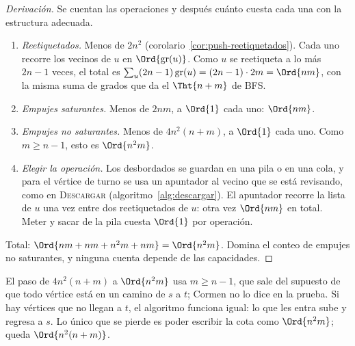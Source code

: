 \documentclass[11pt,letterpaper]{article}
\begin{document}
\begin{proof}[Derivación]
  Se cuentan las operaciones y después cuánto cuesta cada una con la
  estructura adecuada.
  \begin{enumerate}
    \item \emph{Reetiquetados.} Menos de $2n^2$
          (corolario~\ref{cor:push-reetiquetados}). Cada uno recorre los
          vecinos de $u$ en $\Ord{\text{gr}(u)}$. Como $u$ se reetiqueta
          a lo más $2n - 1$ veces, el total es
          $\sum_u (2n - 1)\,\text{gr}(u) = (2n - 1) \cdot 2m = \Ord{nm}$,
          con la misma suma de grados que da el $\Tht{n + m}$ de BFS.
    \item \emph{Empujes saturantes.} Menos de $2nm$, a $\Ord{1}$ cada
          uno: $\Ord{nm}$.
    \item \emph{Empujes no saturantes.} Menos de $4n^2(n + m)$, a
          $\Ord{1}$ cada uno. Como $m \ge n - 1$, esto es
          $\Ord{n^2 m}$.
    \item \emph{Elegir la operación.} Los desbordados se guardan en una
          pila o en una cola, y para el vértice de turno se usa un
          apuntador al vecino que se está revisando, como en
          \textsc{Descargar} (algoritmo~\ref{alg:descargar}). El
          apuntador recorre la lista de $u$ una vez entre dos
          reetiquetados de $u$: otra vez $\Ord{nm}$ en total. Meter y
          sacar de la pila cuesta $\Ord{1}$ por operación.
  \end{enumerate}
  Total: $\Ord{nm + nm + n^2 m + nm} = \Ord{n^2 m}$. Domina el conteo
  de empujes no saturantes, y ninguna cuenta depende de las
  capacidades.
\end{proof}

\begin{ojo}
  El paso de $4n^2(n + m)$ a $\Ord{n^2 m}$ usa $m \ge n - 1$, que sale
  del supuesto de que todo vértice está en un camino de $s$ a $t$;
  Cormen no lo dice en la prueba. Si hay vértices que no llegan a $t$,
  el algoritmo funciona igual: lo que les entra sube y regresa a $s$.
  Lo único que se pierde es poder escribir la cota como $\Ord{n^2 m}$;
  queda $\Ord{n^2(n + m)}$.
\end{ojo}
\end{document}
